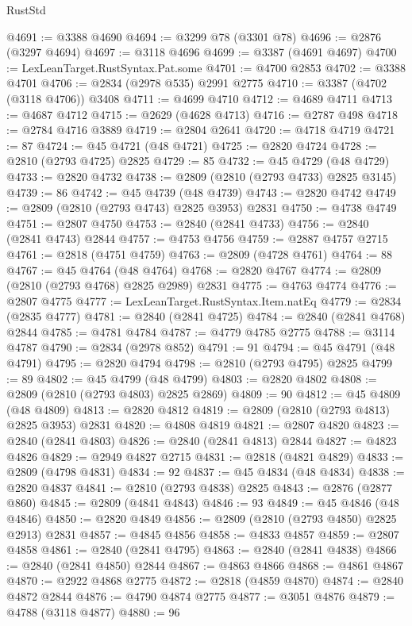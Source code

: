 \begin{lexlean}{RustStd}
\begin{coremodule}
@4691 := @3388 @4690
@4694 := @3299 @78 (@3301 @78)
@4696 := @2876 (@3297 @4694)
@4697 := @3118 @4696
@4699 := @3387 (@4691 @4697)
@4700 := LexLeanTarget.RustSyntax.Pat.some
@4701 := @4700 @2853
@4702 := @3388 @4701
@4706 := @2834 (@2978 @535) @2991 @2775
@4710 := @3387 (@4702 (@3118 @4706)) @3408
@4711 := @4699 @4710
@4712 := @4689 @4711
@4713 := @4687 @4712
@4715 := @2629 (@4628 @4713)
@4716 := @2787 @498
@4718 := @2784 @4716 @3889
@4719 := @2804 @2641
@4720 := @4718 @4719
@4721 := 87
@4724 := @45 @4721 (@48 @4721)
@4725 := @2820 @4724
@4728 := @2810 (@2793 @4725) @2825
@4729 := 85
@4732 := @45 @4729 (@48 @4729)
@4733 := @2820 @4732
@4738 := @2809 (@2810 (@2793 @4733) @2825 @3145)
@4739 := 86
@4742 := @45 @4739 (@48 @4739)
@4743 := @2820 @4742
@4749 := @2809 (@2810 (@2793 @4743) @2825 @3953) @2831
@4750 := @4738 @4749
@4751 := @2807 @4750
@4753 := @2840 (@2841 @4733)
@4756 := @2840 (@2841 @4743) @2844
@4757 := @4753 @4756
@4759 := @2887 @4757 @2715
@4761 := @2818 (@4751 @4759)
@4763 := @2809 (@4728 @4761)
@4764 := 88
@4767 := @45 @4764 (@48 @4764)
@4768 := @2820 @4767
@4774 := @2809 (@2810 (@2793 @4768) @2825 @2989) @2831
@4775 := @4763 @4774
@4776 := @2807 @4775
@4777 := LexLeanTarget.RustSyntax.Item.natEq
@4779 := @2834 (@2835 @4777)
@4781 := @2840 (@2841 @4725)
@4784 := @2840 (@2841 @4768) @2844
@4785 := @4781 @4784
@4787 := @4779 @4785 @2775
@4788 := @3114 @4787
@4790 := @2834 (@2978 @852)
@4791 := 91
@4794 := @45 @4791 (@48 @4791)
@4795 := @2820 @4794
@4798 := @2810 (@2793 @4795) @2825
@4799 := 89
@4802 := @45 @4799 (@48 @4799)
@4803 := @2820 @4802
@4808 := @2809 (@2810 (@2793 @4803) @2825 @2869)
@4809 := 90
@4812 := @45 @4809 (@48 @4809)
@4813 := @2820 @4812
@4819 := @2809 (@2810 (@2793 @4813) @2825 @3953) @2831
@4820 := @4808 @4819
@4821 := @2807 @4820
@4823 := @2840 (@2841 @4803)
@4826 := @2840 (@2841 @4813) @2844
@4827 := @4823 @4826
@4829 := @2949 @4827 @2715
@4831 := @2818 (@4821 @4829)
@4833 := @2809 (@4798 @4831)
@4834 := 92
@4837 := @45 @4834 (@48 @4834)
@4838 := @2820 @4837
@4841 := @2810 (@2793 @4838) @2825
@4843 := @2876 (@2877 @860)
@4845 := @2809 (@4841 @4843)
@4846 := 93
@4849 := @45 @4846 (@48 @4846)
@4850 := @2820 @4849
@4856 := @2809 (@2810 (@2793 @4850) @2825 @2913) @2831
@4857 := @4845 @4856
@4858 := @4833 @4857
@4859 := @2807 @4858
@4861 := @2840 (@2841 @4795)
@4863 := @2840 (@2841 @4838)
@4866 := @2840 (@2841 @4850) @2844
@4867 := @4863 @4866
@4868 := @4861 @4867
@4870 := @2922 @4868 @2775
@4872 := @2818 (@4859 @4870)
@4874 := @2840 @4872 @2844
@4876 := @4790 @4874 @2775
@4877 := @3051 @4876
@4879 := @4788 (@3118 @4877)
@4880 := 96

\end{coremodule}
\end{lexlean}
